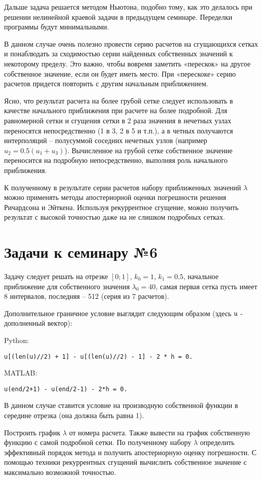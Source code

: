 Дальше задача решается методом Ньютона, подобно тому, как это делалось при решении нелинейной краевой задачи в предыдущем семинаре. Переделки программы будут минимальными.

В данном случае очень полезно провести серию расчетов на сгущающихся сетках и понаблюдать за сходимостью серии найденных собственных значений к некоторому пределу. Это важно, чтобы вовремя заметить «перескок» на другое собственное значение, если он будет иметь место. При «перескоке» серию расчетов придется повторить с другим начальным приближением.

Ясно, что результат расчета на более грубой сетке следует использовать в качестве начального приближения при расчете на более подробной. Для равномерной сетки и сгущения сетки в 2 раза значения в нечетных узлах переносятся непосредственно (1 в 3, 2 в 5 и т.п.), а в четных получаются интерполяций – полусуммой соседних нечетных узлов (например $u_2 = 0.5(u_1+u_3)$). Вычисленное на грубой сетке собственное значение переносится на подробную непосредственно, выполняя роль начального приближения.

К полученному в результате серии расчетов набору приближенных значений $\lambda$ можно применять методы апостериорной оценки погрешности решения Ричардсона и Эйткена. Используя рекуррентное сгущение, можно получить результат с высокой точностью даже на не слишком подробных сетках. 

\section*{Задачи к семинару №6}
Задачу следует решать на отрезке $[0; 1]$, $k_0 = 1$, $k_1 = 0.5$, начальное приближение для собственного значения $\lambda_0 = 40$, самая первая сетка пусть имеет 8 интервалов, последняя – 512  (серия из 7 расчетов). 

Дополнительное граничное условие выглядит следующим образом (здесь $\texttt{\lstinline|u|}$ - дополненный вектор):

Python:
\begin{verbatim}
u[(len(u)//2) + 1] - u[(len(u)//2) - 1] - 2 * h = 0.
\end{verbatim}
MATLAB:
\begin{matlablisting}
	\begin{verbatim}
u(end/2+1) - u(end/2-1) - 2*h = 0.
	\end{verbatim}
\end{matlablisting}
В данном случае ставится условие на производную собственной функции в середине отрезка (она должна быть равна 1).

Построить график $\lambda$ от номера расчета. Также вывести на график собственную функцию с самой подробной сетки. По полученному набору $\lambda$ определить эффективный порядок метода и получить апостериорную оценку погрешности. С помощью техники рекуррентных сгущений вычислить собственное значение с максимально возможной точностью.
